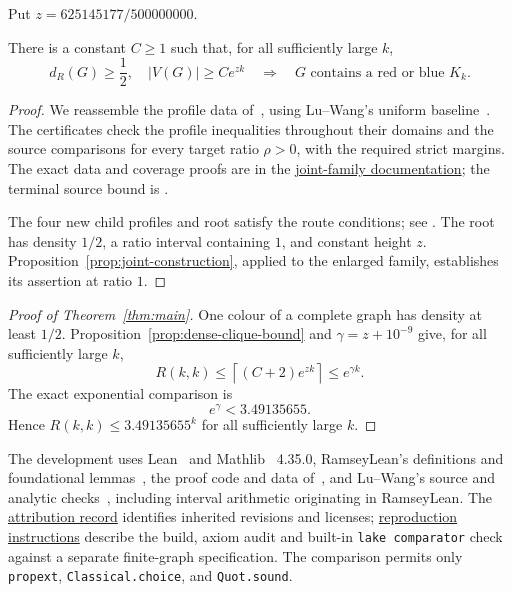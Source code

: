 Put $z=625145177/500000000$.
\begin{proposition}\label{prop:dense-clique-bound}
There is a constant $C\ge1$ such that, for all sufficiently large $k$,
\[
 d_R(G)\ge\frac12,\quad |V(G)|\ge Ce^{zk}
 \quad\Longrightarrow\quad
 G\text{ contains a red or blue }K_k.
\]
\end{proposition}
\begin{proof}

We reassemble the profile data of~\cite{ZBS}, using Lu--Wang's uniform
baseline~\cite[Lemma~B.1]{LW}. The certificates check the profile
inequalities throughout their domains and the source comparisons for
every target ratio $\rho>0$, with the required strict margins.
The exact data and coverage
proofs are in the
\href{\leanrepo/S7_ParameterChoice/Source/Joint/README.md}{joint-family documentation};
the terminal source bound is
.

The four new child profiles and root satisfy the route conditions; see
.
The root has density $1/2$, a ratio interval containing $1$, and constant
height $z$. Proposition~\ref{prop:joint-construction}, applied to the
enlarged family, establishes its assertion at ratio $1$.
\end{proof}

\begin{proof}[Proof of Theorem~\ref{thm:main}]
One colour of a complete graph has density at least $1/2$.
Proposition~\ref{prop:dense-clique-bound} and $\gamma=z+10^{-9}$ give,
for all sufficiently large $k$,
\[
 R(k,k)\le\left\lceil(C+2)e^{zk}\right\rceil\le e^{\gamma k}.
\]
The exact exponential comparison is
\[
 e^\gamma<3.49135655.
\]
Hence $R(k,k)\le3.49135655^k$ for all sufficiently large $k$.
\end{proof}

The development uses Lean~\cite{Lean} and Mathlib~\cite{Mathlib}
4.35.0, RamseyLean's definitions and foundational lemmas~\cite{RamseyLean,GNNW},
the proof code and data of~\cite{ZBS}, and Lu--Wang's source and
analytic checks~\cite{LW}, including interval arithmetic originating
in RamseyLean. The \href{\leanrepo/NOTICE.md}{attribution record}
identifies inherited revisions and licenses;
\href{\leanrepo/Scripts/README.md}{reproduction instructions} describe
the build, axiom audit and built-in \texttt{lake comparator} check
against a separate finite-graph specification. The comparison permits only
\texttt{propext}, \texttt{Classical.choice}, and \texttt{Quot.sound}.
